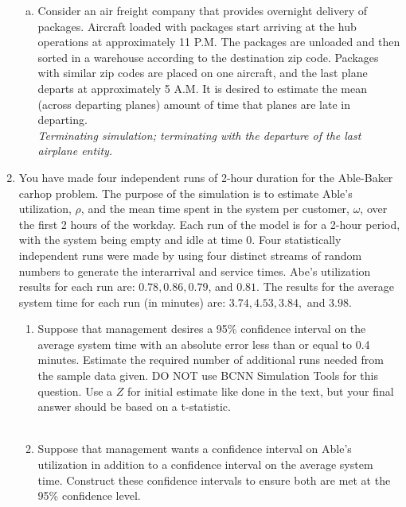 \documentclass[12pt]{amsart}
\begin{document}
\begin{enumerate}[1.]
\begin{enumerate}[a.]
	\item Consider an air freight company that provides overnight delivery of packages. Aircraft
	loaded with packages start arriving at the hub operations at approximately 11 P.M. The
	packages are unloaded and then sorted in a warehouse according to the destination zip code.
	Packages with similar zip codes are placed on one aircraft, and the last plane departs at
	approximately 5 A.M. It is desired to estimate the mean (across departing planes) amount
	of time that planes are late in departing. \\
	
	\textit{Terminating simulation; terminating with the departure of the last
		airplane entity.}\\
	
\end{enumerate}
\clearpage

\item You have made four independent runs of 2-hour duration for the Able-Baker carhop problem.
The purpose of the simulation is to estimate Able’s utilization, \(\rho\), and the mean time spent in
the system per customer, \(\omega\), over the first 2 hours of the workday. Each run of the model is for
a 2-hour period, with the system being empty and idle at time 0. Four statistically independent
runs were made by using four distinct streams of random numbers to generate the interarrival
and service times. Abe’s utilization results for each run are: \(0.78, 0.86, 0.79\), and \(0.81\). The
results for the average system time for each run (in minutes) are: \(3.74, 4.53, 3.84,\) and \(3.98\). \\

\begin{enumerate}
	\item Suppose that management desires a 95\% confidence interval on the average system time
	with an absolute error less than or equal to 0.4 minutes. Estimate the required number of
	additional runs needed from the sample data given. DO NOT use BCNN Simulation Tools
	for this question. Use a \(Z\) for initial estimate like done in the text, but your final answer
	should be based on a t-statistic. \\
	
	\textit{}\\
	
	\item Suppose that management wants a confidence interval on Able’s utilization in addition to a
	confidence interval on the average system time. Construct these confidence intervals to
	ensure both are met at the 95\% confidence level. \\
	
	\textit{}\\
	
\end{enumerate}



\end{enumerate}
	
\end{document}
